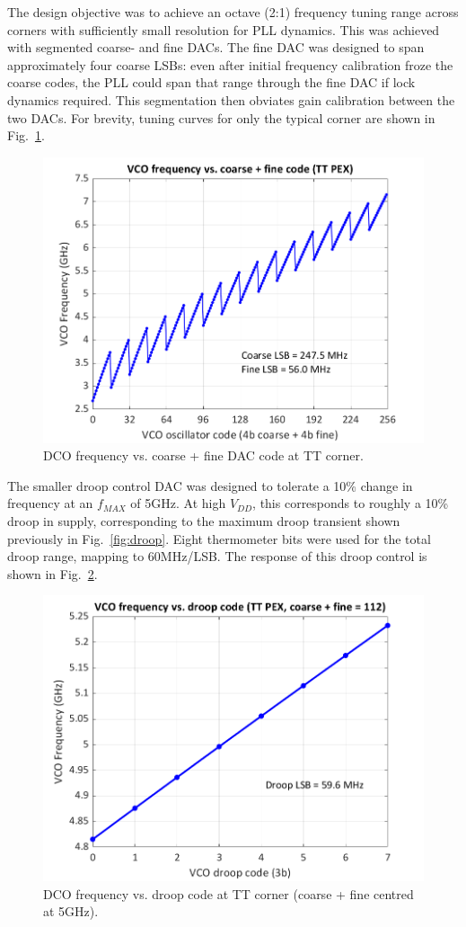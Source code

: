 \documentclass[twoside,9pt,journal,letterpage]{IEEEtran}
\begin{document}
The design objective was to achieve an octave (2:1) frequency tuning range across corners with sufficiently small resolution for PLL dynamics. This was achieved with segmented coarse- and fine DACs. The fine DAC was designed to span approximately four coarse LSBs: even after initial frequency calibration froze the coarse codes, the PLL could span that range through the fine DAC if lock dynamics required. This segmentation then obviates gain calibration between the two DACs. For brevity, tuning curves for only the typical corner are shown in Fig.\ \ref{fig:dco_oscctrl}.

\vspace{-10pt}
\begin{figure}[h]
	\centering
	\includegraphics[width=0.7\columnwidth]{fig_dco_oscctrl}
	\caption{DCO frequency vs. coarse + fine DAC code at TT corner.}
	\label{fig:dco_oscctrl}
\end{figure}

The smaller droop control DAC was designed to tolerate a 10\% change in frequency at an $f_{MAX}$ of 5GHz. At high $V_{DD}$, this corresponds to roughly a 10\% droop in supply, corresponding to the maximum droop transient shown previously in Fig.\ \ref{fig:droop}. Eight thermometer bits were used for the total droop range, mapping to 60MHz/LSB. The response of this droop control is shown in Fig.\ \ref{fig:dco_droopctrl}.

\vspace{-10pt}
\begin{figure}[h]
	\centering
	\includegraphics[width=0.7\columnwidth]{fig_dco_droopctrl}
	\caption{DCO frequency vs. droop code at TT corner (coarse + fine centred at 5GHz).}
	\label{fig:dco_droopctrl}
\end{figure}
\vspace{-5pt}
\end{document}
